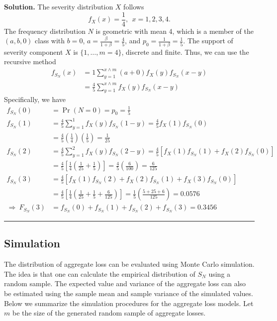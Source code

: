 \documentclass[]{book}
\theoremstyle{definition}
\theoremstyle{definition}
\theoremstyle{definition}
\theoremstyle{remark}
\begin{document}
\hypertarget{toggleExampleAggLoss.4.1}{}
\textbf{Solution.} The severity distribution \(X\) follows
\[f_X (x) = \frac{1}{4}, \ \ x=1, 2, 3, 4.\] The frequency distribution
\(N\) is geometric with mean 4, which is a member of the \((a,b,0)\)
class with \(b=0\), \(a=\frac{\beta}{1+\beta} = \frac{4}{5}\), and
\(p_0 = \frac{1}{1+\beta} = \frac{1}{5}\). The support of severity
component \(X\) is \(\{1,\ldots,m=4 \}\), discrete and finite. Thus, we
can use the recursive method \[\begin{aligned}
f_{S_N} (x) &= 1 \sum_{y=1}^{x\wedge m} (a+0) f_X (y) f_{S_N} (x-y) \\
&= \frac{4}{5} \sum_{y=1}^{x\wedge m} f_X (y) f_{S_N} (x-y)
\end{aligned}\] Specifically, we have \[\begin{aligned}
f_{S_N} (0) &= \Pr(N=0) = p_0=\frac{1}{5}\\
f_{S_N} (1) &= \frac{4}{5}\sum_{y=1}^{1} f_X (y) f_{S_N} (1-y) = \frac{4}{5} f_X(1) f_{S_N}(0)\\
&= \frac{4}{5}\left( \frac{1}{4}\right)\left(\frac{1}{5} \right) = \frac{1}{25}\\
f_{S_N} (2) &=  \frac{4}{5}\sum_{y=1}^{2} f_X (y) f_{S_N} (2-y) = \frac{4}{5} \left[ f_X(1)f_{S_N}(1) + f_X(2) f_{S_N}(0) \right] \\
&= \frac{4}{5}\left[ \frac{1}{4} \left( \frac{1}{25} + \frac{1}{5}\right) \right] =
\frac{4}{5}\left( \frac{6}{100}\right) = \frac{6}{125}\\
f_{S_N} (3) &= \frac{4}{5} \left[ f_X(1) f_{S_N}(2) + f_X(2)f_{S_N}(1) + f_X(3) f_{S_N}(0) \right]\\
&= \frac{4}{5}\left[ \frac{1}{4} \left( \frac{1}{25} + \frac{1}{5} +
\frac{6}{125}\right) \right] = \frac{1}{5}\left( \frac{5+25+6}{125}\right) = 0.0576\\
\Rightarrow \ F_{S_N} (3) &= f_{S_N} (0)+f_{S_N} (1)+f_{S_N} (2) +f_{S_N} (3) = 0.3456
\end{aligned}\]

\begin{center}\rule{0.5\linewidth}{\linethickness}\end{center}

\subsection{Simulation}\label{simulation}

The distribution of aggregate loss can be evaluated using Monte Carlo
simulation. The idea is that one can calculate the empirical
distribution of \(S_N\) using a random sample. The expected value and
variance of the aggregate loss can also be estimated using the sample
mean and sample variance of the simulated values. Below we summarize the
simulation procedures for the aggregate loss models. Let \(m\) be the
size of the generated random sample of aggregate losses.
\end{document}
